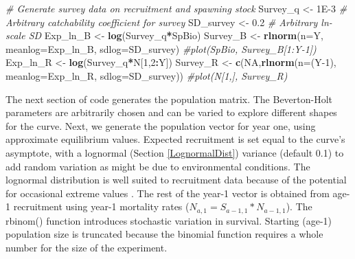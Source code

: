\documentclass[
]{krantz}
\makeatletter
\newenvironment{Shaded}{\begin{snugshade}}{\end{snugshade}}
\newcommand{\AttributeTok}[1]{\textcolor[rgb]{0.27,0.27,0.27}{#1}}
\newcommand{\CommentTok}[1]{\textcolor[rgb]{0.37,0.37,0.37}{\textit{#1}}}
\newcommand{\ConstantTok}[1]{\textcolor[rgb]{0.37,0.37,0.37}{#1}}
\newcommand{\DecValTok}[1]{\textcolor[rgb]{0.06,0.06,0.06}{#1}}
\newcommand{\FloatTok}[1]{\textcolor[rgb]{0.06,0.06,0.06}{#1}}
\newcommand{\FunctionTok}[1]{\textcolor[rgb]{0.27,0.27,0.27}{\textbf{#1}}}
\newcommand{\NormalTok}[1]{#1}
\newcommand{\OtherTok}[1]{\textcolor[rgb]{0.37,0.37,0.37}{#1}}
\newcommand{\SpecialCharTok}[1]{\textcolor[rgb]{0.43,0.43,0.43}{\textbf{#1}}}
\newenvironment{kframe}{%
\medskip{}
\setlength{\fboxsep}{.8em}
 \def\at@end@of@kframe{}%
 \ifinner\ifhmode%
  \def\at@end@of@kframe{\end{minipage}}%
  \begin{minipage}{\columnwidth}%
 \fi\fi%
 \def\FrameCommand##1{\hskip\@totalleftmargin \hskip-\fboxsep
 \colorbox{shadecolor}{##1}\hskip-\fboxsep
     \hskip-\linewidth \hskip-\@totalleftmargin \hskip\columnwidth}%
 \MakeFramed {\advance\hsize-\width
   \@totalleftmargin\z@ \linewidth\hsize
   \@setminipage}}%
 {\par\unskip\endMakeFramed%
 \at@end@of@kframe}
\renewenvironment{Shaded}{\begin{kframe}}{\end{kframe}}
\makeatother
\begin{document}
\begin{Shaded}
\begin{Highlighting}[]
\CommentTok{\# Generate survey data on recruitment and spawning stock}
\NormalTok{Survey\_q }\OtherTok{\textless{}{-}} \FloatTok{1E{-}3} \CommentTok{\# Arbitrary catchability coefficient for survey}
\NormalTok{SD\_survey }\OtherTok{\textless{}{-}} \FloatTok{0.2} \CommentTok{\# Arbitrary ln{-}scale SD}
\NormalTok{Exp\_ln\_B }\OtherTok{\textless{}{-}} \FunctionTok{log}\NormalTok{(Survey\_q}\SpecialCharTok{*}\NormalTok{SpBio)}
\NormalTok{Survey\_B }\OtherTok{\textless{}{-}} \FunctionTok{rlnorm}\NormalTok{(}\AttributeTok{n=}\NormalTok{Y, }\AttributeTok{meanlog=}\NormalTok{Exp\_ln\_B, }\AttributeTok{sdlog=}\NormalTok{SD\_survey)}
\CommentTok{\#plot(SpBio, Survey\_B[1:Y{-}1])}
\NormalTok{Exp\_ln\_R }\OtherTok{\textless{}{-}} \FunctionTok{log}\NormalTok{(Survey\_q}\SpecialCharTok{*}\NormalTok{N[}\DecValTok{1}\NormalTok{,}\DecValTok{2}\SpecialCharTok{:}\NormalTok{Y])}
\NormalTok{Survey\_R }\OtherTok{\textless{}{-}} \FunctionTok{c}\NormalTok{(}\ConstantTok{NA}\NormalTok{,}\FunctionTok{rlnorm}\NormalTok{(}\AttributeTok{n=}\NormalTok{(Y}\DecValTok{{-}1}\NormalTok{), }\AttributeTok{meanlog=}\NormalTok{Exp\_ln\_R, }\AttributeTok{sdlog=}\NormalTok{SD\_survey))}
\CommentTok{\#plot(N[1,], Survey\_R)}
\end{Highlighting}
\end{Shaded}

The next section of code generates the population matrix. The Beverton-Holt parameters are arbitrarily chosen and can be varied to explore different shapes for the curve. Next, we generate the population vector for year one, using approximate equilibrium values. Expected recruitment is set equal to the curve's asymptote, with a lognormal (Section \ref{LognormalDist}) variance (default 0.1) to add random variation as might be due to environmental conditions. The lognormal distribution is well suited to recruitment data because of the potential for occasional extreme values \citep{hilborn.walters_1992}. The rest of the year-1 vector is obtained from age-1 recruitment using year-1 mortality rates (\(N_{a,1}=S_{a-1,1}*N_{a-1,1}\)). The rbinom() function introduces stochastic variation in survival. Starting (age-1) population size is truncated because the binomial function requires a whole number for the size of the experiment.
\end{document}

